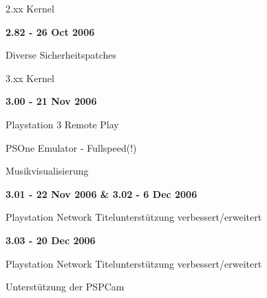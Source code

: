\documentclass[mode=print,paper=screen,size=10pt,style=paintings]{powerdot}
\begin{document}
\begin{slide}{2.xx Kernel}
	\begin{large}\textbf{2.82 - 26 Oct 2006}\end{large}
	\begin{list}{-}{}
		\item{Diverse Sicherheitspatches}
	\end{list}
\end{slide}

\begin{slide}{3.xx Kernel}
	\begin{large}\textbf{3.00 - 21 Nov 2006}\end{large}
	\begin{list}{-}{}
		\item{Playstation 3 Remote Play}
		\item{PSOne Emulator - Fullspeed(!)}
		\item{Musikvisualisierung}
	\end{list}
	\begin{large}\textbf{3.01 - 22 Nov 2006 \&  3.02 - 6 Dec 2006}\end{large}
	\begin{list}{-}{}
		\item{Playstation Network Titelunterstützung verbessert/erweitert}
	\end{list}
	\begin{large}\textbf{3.03 - 20 Dec 2006}\end{large}
	\begin{list}{-}{}
		\item{Playstation Network Titelunterstützung verbessert/erweitert}
		\item{Unterstützung der PSPCam}
	\end{list}
\end{slide}
\end{document}
